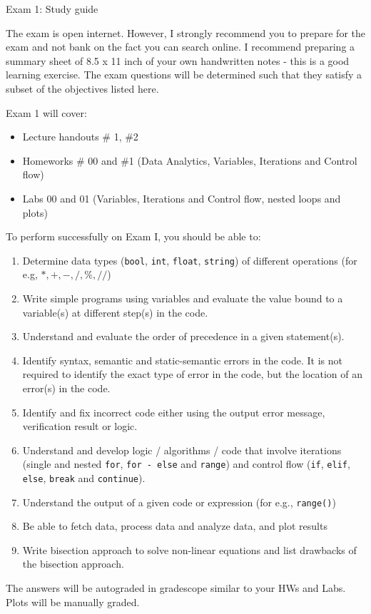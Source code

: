\documentclass[]{article}
\begin{document}
\begin{center}
\Large Exam 1: Study guide
\end{center}

The exam is open internet. However, I strongly recommend you to prepare for the exam and not bank on the fact you can search online. I recommend preparing a summary sheet of 8.5 x 11 inch of your own handwritten notes - this is a good learning exercise. The exam questions will be determined such that they satisfy a subset of the objectives listed here.

Exam 1 will cover:
\begin{itemize}
	\item Lecture handouts \# 1, \#2
	\item Homeworks \# 00 and \#1 (Data Analytics, Variables, Iterations and Control flow)
	\item Labs 00 and 01 (Variables, Iterations and Control flow, nested loops and plots)
\end{itemize}

To perform successfully on Exam I, you should be able to:

\begin{enumerate}
	\item Determine data types (\verb|bool|, \verb|int|, \verb|float|, \verb|string|) of different operations (for e.g, $*, +, -, /, \%, //$)
	\item Write simple programs using variables and evaluate the value bound to a variable(s) at different step(s) in the code.
	\item Understand and evaluate the order of precedence in a given statement(s).
	\item Identify syntax, semantic and static-semantic errors in the code. It is not required to identify the exact type of error in the code, but the location of an error(s) in the code.
	\item Identify and fix incorrect code either using the output error message, verification result or logic.
	\item Understand and develop logic / algorithms / code that involve iterations (single and nested \verb|for|, \verb|for - else| and \verb|range|) and control flow (\verb|if|, \verb|elif|, \verb|else|, \verb|break| and \verb|continue|).
	\item Understand the output of a given code or expression (for e.g., \verb|range()|)
 	\item Be able to fetch data, process data and analyze data, and plot results
	\item Write bisection approach to solve non-linear equations and list drawbacks of the bisection approach.

\end{enumerate}


The answers will be autograded in gradescope similar to your HWs and Labs. Plots will be manually graded. 
\end{document}
